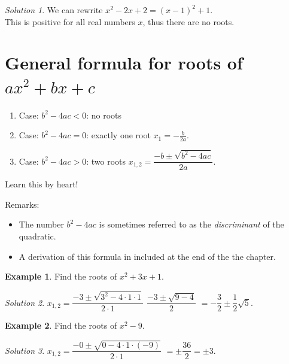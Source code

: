 \documentclass[
  english,
  12pt,
  oneside]{book}
\providecommand{\tightlist}{%
  \setlength{\itemsep}{0pt}\setlength{\parskip}{0pt}}
\theoremstyle{definition}
\theoremstyle{definition}
\newtheorem{example}{Example}[chapter]
\theoremstyle{definition}
\theoremstyle{definition}
\theoremstyle{remark}
\newtheorem*{solution}{Solution}
\begin{document}
\begin{solution}
We can rewrite \(x^2-2x+2=(x-1)^2+1\).\\
This is positive for all real numbers \(x\), thus there are no roots.
\end{solution}

\section{\texorpdfstring{General formula for roots of \(ax^2+bx+c\)}{General formula for roots of ax\^{}2+bx+c}}\label{general-formula-for-roots-of-ax2bxc}

\begin{enumerate}
\def\labelenumi{\arabic{enumi}.}
\tightlist
\item
  Case: \(b^2-4ac < 0\): no roots
\item
  Case: \(b^2-4ac = 0\): exactly one root \(x_1=-\frac{b}{2a}\).
\item
  Case: \(b^2-4ac > 0\): two roots \(x_{1,2}=\dfrac{-b\pm\sqrt{b^2-4ac}}{2a}\).
\end{enumerate}

Learn this by heart!

Remarks:

\begin{itemize}
\tightlist
\item
  The number \(b^2-4ac\) is sometimes referred to as the \emph{discriminant} of the quadratic.
\item
  A derivation of this formula in included at the end of the the chapter.
\end{itemize}

\begin{example}
Find the roots of \(x^2+3x+1\).
\end{example}

\begin{solution}
\(x_{1,2}=\dfrac{-3\pm\sqrt{3^2-4\cdot1\cdot1}}{2\cdot 1}\) \(\dfrac{-3\pm\sqrt{9-4}}{2}\) \(=-\dfrac{3}{2}\pm\dfrac{1}{2}\sqrt{5}\).
\end{solution}

\begin{example}
Find the roots of \(x^2-9\).
\end{example}

\begin{solution}
\(x_{1,2}=\dfrac{-0\pm\sqrt{0-4\cdot1\cdot(-9)}}{2\cdot1}\) \(=\pm\dfrac{36}{2}=\pm 3\).
\end{solution}
\end{document}
